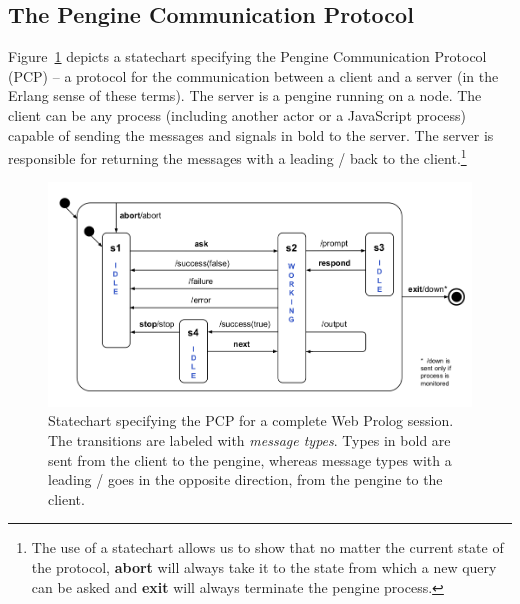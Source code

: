 \documentclass{tlp}
\begin{document}
\subsection{The Pengine Communication Protocol}\label{sec:pcp}


\noindent Figure~\ref{fig:statechart} depicts a statechart specifying the Pengine Communication Protocol (PCP) -- a protocol for the communication between a client and a server (in the Erlang sense of these terms). The server is a pengine running on a node. The client can be any process (including another actor or a JavaScript process) capable of sending the messages and signals in bold to the server. The server is responsible for returning the messages with a leading / back to the client.\footnote{The use of a statechart allows us to show that no matter the current state of the protocol, \textbf{abort} will always take it to the state from which a new query can be asked and \textbf{exit} will always terminate the pengine process.}




\begin{figure}[h]
    \centering
	\includegraphics[width=12cm]{statechart}
    \caption{Statechart specifying the PCP for a complete Web Prolog session. The transitions are labeled with \textit{message types}. Types in bold are sent from the client to the pengine, whereas message types with a leading / goes in the opposite direction, from the pengine to the client.}
    \label{fig:statechart}
\end{figure}
\end{document}
